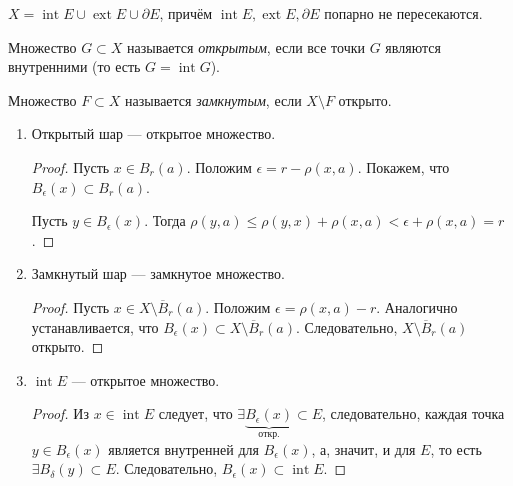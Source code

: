 \begin{note}
    $X = \operatorname{int} E \cup \operatorname{ext} E \cup \partial E$, причём $\operatorname{int} E, \operatorname{ext} E, \partial E$ попарно не пересекаются.
\end{note}

\begin{definition}
    Множество $G \subset X$ называется \emph{открытым}, если все точки $G$ являются внутренними (то есть $G = \operatorname{int} G$).

    Множество $F \subset X$ называется \emph{замкнутым}, если $X \setminus F$ открыто.
\end{definition}

\begin{example}
    \begin{enumerate}
        \item Открытый шар --- открытое множество.
            \begin{proof}
                Пусть $x \in B_r(a)$. Положим $\epsilon = r - \rho(x, a)$. Покажем, что $B_\epsilon(x) \subset B_r(a)$.

                Пусть $y \in B_\epsilon(x)$. Тогда $\rho(y, a) \le \rho(y, x) + \rho(x, a) < \epsilon + \rho(x, a) = r$.
            \end{proof}

        \item Замкнутый шар --- замкнутое множество.
            \begin{proof}
                Пусть $x \in X \setminus \overline{B}_r(a)$. Положим $\epsilon = \rho(x, a) - r$. Аналогично устанавливается, что $B_\epsilon (x) \subset X \setminus \overline{B}_r (a)$. Следовательно, $X \setminus \overline{B}_r(a)$ открыто.
            \end{proof}

        \item $\operatorname{int} E$ --- открытое множество.
            \begin{proof}
                Из $x \in \operatorname{int} E$ следует, что $\exists \underbrace{B_\epsilon(x)}_{\text{откр.}} \subset E$, следовательно, каждая точка $y \in B_\epsilon(x)$ является внутренней для $B_\epsilon(x)$, а, значит, и для $E$, то есть $\exists B_\delta(y) \subset E$. Следовательно, $B_\epsilon(x) \subset \operatorname{int} E$.
            \end{proof}
    \end{enumerate}
\end{example}

